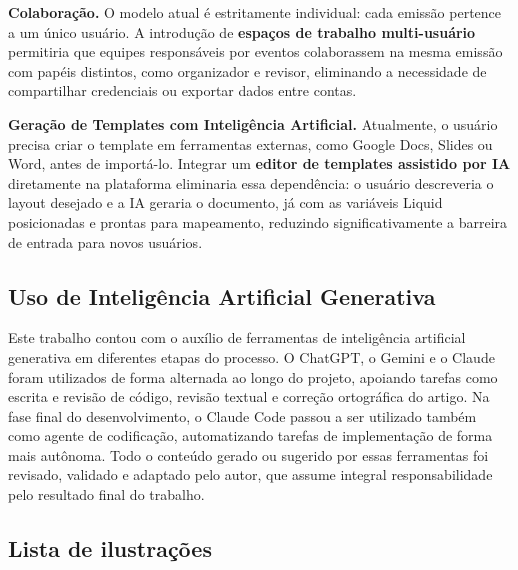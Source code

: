 \documentclass[article,a4paper,12pt,brazil,sumario=tradicional]{abntex2}
\begin{document}
\vspace{3mm}\noindent\textbf{Colaboração.}
%
O modelo atual é estritamente individual: cada emissão pertence a um único usuário. A introdução de \textbf{espaços de trabalho multi-usuário} permitiria que equipes responsáveis por eventos colaborassem na mesma emissão com papéis distintos, como organizador e revisor, eliminando a necessidade de compartilhar credenciais ou exportar dados entre contas.

\vspace{3mm}\noindent\textbf{Geração de Templates com Inteligência Artificial.}
%
Atualmente, o usuário precisa criar o template em ferramentas externas, como Google Docs, Slides ou Word, antes de importá-lo. Integrar um \textbf{editor de templates assistido por IA} diretamente na plataforma eliminaria essa dependência: o usuário descreveria o layout desejado e a IA geraria o documento, já com as variáveis Liquid posicionadas e prontas para mapeamento, reduzindo significativamente a barreira de entrada para novos usuários.

\section{Uso de Inteligência Artificial Generativa}\label{sec:ia-generativa}

Este trabalho contou com o auxílio de ferramentas de inteligência artificial generativa em diferentes etapas do processo. O ChatGPT, o Gemini e o Claude foram utilizados de forma alternada ao longo do projeto, apoiando tarefas como escrita e revisão de código, revisão textual e correção ortográfica do artigo. Na fase final do desenvolvimento, o Claude Code passou a ser utilizado também como agente de codificação, automatizando tarefas de implementação de forma mais autônoma. Todo o conteúdo gerado ou sugerido por essas ferramentas foi revisado, validado e adaptado pelo autor, que assume integral responsabilidade pelo resultado final do trabalho.


\newpage


\begin{appendices}

\newpage
\chapter{Lista de ilustrações}
\vspace{-35pt}
\renewcommand{\listfigurename}{}
\listoffigures

\end{appendices}
\end{document}
